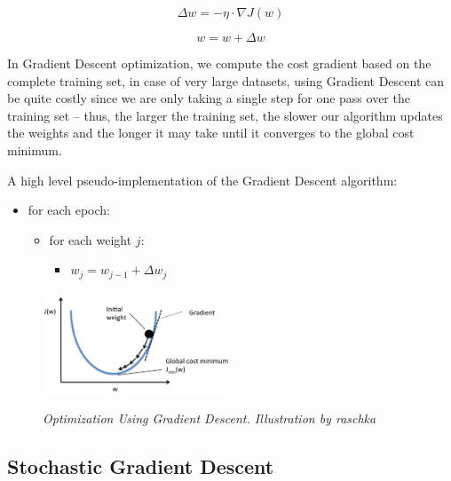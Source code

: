 \[
  \Delta w = -\eta \cdot \nabla J(w)
\]


\[
  w = w + \Delta w
\]



In Gradient Descent optimization, we compute the cost gradient based on the
complete training set, in case of very large datasets, using Gradient Descent
can be quite costly since we are only taking a single step for one pass over
the training set – thus, the larger the training set, the slower our algorithm
updates the weights and the longer it may take until it converges to the global
cost minimum. \newline

A high level pseudo-implementation of the Gradient Descent algorithm: \\

\begin{itemize}[label=\(\circ\)]
  \item for each epoch:
    \begin{itemize}[label=\(\circ\), topsep=0pt]
      \item for each weight \(j\):
        \begin{itemize}[label=\(\circ\), topsep=5pt]
          \item \(w_j = w_{j-1} + \Delta w_j\)
        \end{itemize}
    \end{itemize}
\end{itemize}

\begin{figure}[H]
  \centering
  \includegraphics[width=0.5\textwidth]{imatges/preliminaries/optimization.png}
  \caption[Optimization Using Gradient Descent]{\textit{Optimization Using Gradient Descent. Illustration by raschka}}
  {\label{fig:optimization}}
\end{figure}

\newpage

\subsection{Stochastic Gradient Descent}

